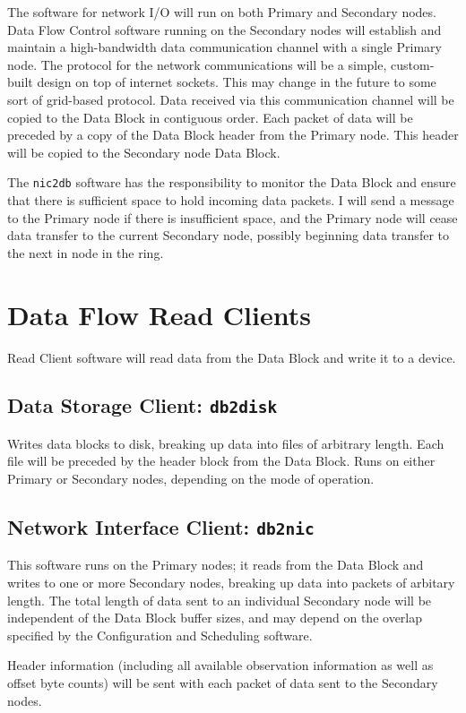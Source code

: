 The software for network I/O will run on both Primary and Secondary
nodes.  Data Flow Control software running on the Secondary nodes will
establish and maintain a high-bandwidth data communication channel
with a single Primary node.  The protocol for the network
communications will be a simple, custom-built design on top of
internet sockets.  This may change in the future to some sort of
grid-based protocol.  Data received via this communication channel
will be copied to the Data Block in contiguous order.  Each packet of
data will be preceded by a copy of the Data Block header from the
Primary node.  This header will be copied to the Secondary node Data
Block.

The {\tt nic2db} software has the responsibility to monitor the Data
Block and ensure that there is sufficient space to hold incoming data
packets.  I will send a message to the Primary node if there is
insufficient space, and the Primary node will cease data transfer to
the current Secondary node, possibly beginning data transfer to the
next in node in the ring.

\section{Data Flow Read Clients}

Read Client software will read data from the Data Block and write it
to a device.

\subsection{Data Storage Client: {\tt db2disk}}

Writes data blocks to disk, breaking up data into files of arbitrary
length.  Each file will be preceded by the header block from the Data
Block.  Runs on either Primary or Secondary nodes, depending on the
mode of operation.

\subsection{Network Interface Client: {\tt db2nic}}

This software runs on the Primary nodes; it reads from the Data Block
and writes to one or more Secondary nodes, breaking up data into
packets of arbitary length.  The total length of data sent to an
individual Secondary node will be independent of the Data Block buffer
sizes, and may depend on the overlap specified by the Configuration
and Scheduling software.

Header information (including all available observation information as
well as offset byte counts) will be sent with each packet of data sent
to the Secondary nodes.
